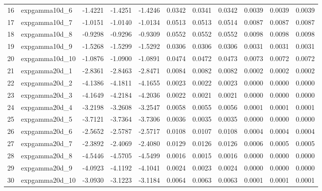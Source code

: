 \begin{table}[ht]
\begin{tabular}{rlrrrrrrrrr}
  16 & expgamma10d\_6 & -1.4221 & -1.4251 & -1.4246 & 0.0342 & 0.0341 & 0.0342 & 0.0039 & 0.0039 & 0.0039 \\ 
  17 & expgamma10d\_7 & -1.0151 & -1.0140 & -1.0134 & 0.0513 & 0.0513 & 0.0514 & 0.0087 & 0.0087 & 0.0087 \\ 
  18 & expgamma10d\_8 & -0.9298 & -0.9296 & -0.9309 & 0.0552 & 0.0552 & 0.0552 & 0.0098 & 0.0098 & 0.0098 \\ 
  19 & expgamma10d\_9 & -1.5268 & -1.5299 & -1.5292 & 0.0306 & 0.0306 & 0.0306 & 0.0031 & 0.0031 & 0.0031 \\ 
  20 & expgamma10d\_10 & -1.0876 & -1.0900 & -1.0891 & 0.0474 & 0.0472 & 0.0473 & 0.0073 & 0.0072 & 0.0072 \\ 
  21 & expgamma20d\_1 & -2.8361 & -2.8463 & -2.8471 & 0.0084 & 0.0082 & 0.0082 & 0.0002 & 0.0002 & 0.0002 \\ 
  22 & expgamma20d\_2 & -4.1386 & -4.1811 & -4.1655 & 0.0023 & 0.0022 & 0.0023 & 0.0000 & 0.0000 & 0.0000 \\ 
  23 & expgamma20d\_3 & -4.1649 & -4.2184 & -4.2036 & 0.0022 & 0.0021 & 0.0021 & 0.0000 & 0.0000 & 0.0000 \\ 
  24 & expgamma20d\_4 & -3.2198 & -3.2608 & -3.2547 & 0.0058 & 0.0055 & 0.0056 & 0.0001 & 0.0001 & 0.0001 \\ 
  25 & expgamma20d\_5 & -3.7121 & -3.7364 & -3.7306 & 0.0036 & 0.0035 & 0.0035 & 0.0000 & 0.0000 & 0.0000 \\ 
  26 & expgamma20d\_6 & -2.5652 & -2.5787 & -2.5717 & 0.0108 & 0.0107 & 0.0108 & 0.0004 & 0.0004 & 0.0004 \\ 
  27 & expgamma20d\_7 & -2.3892 & -2.4069 & -2.4080 & 0.0129 & 0.0126 & 0.0126 & 0.0006 & 0.0005 & 0.0005 \\ 
  28 & expgamma20d\_8 & -4.5446 & -4.5705 & -4.5499 & 0.0016 & 0.0015 & 0.0016 & 0.0000 & 0.0000 & 0.0000 \\ 
  29 & expgamma20d\_9 & -4.0923 & -4.1192 & -4.1041 & 0.0024 & 0.0023 & 0.0024 & 0.0000 & 0.0000 & 0.0000 \\ 
  30 & expgamma20d\_10 & -3.0930 & -3.1223 & -3.1184 & 0.0064 & 0.0063 & 0.0063 & 0.0001 & 0.0001 & 0.0001 \\ 
   \hline
\end{tabular}
\end{table}
